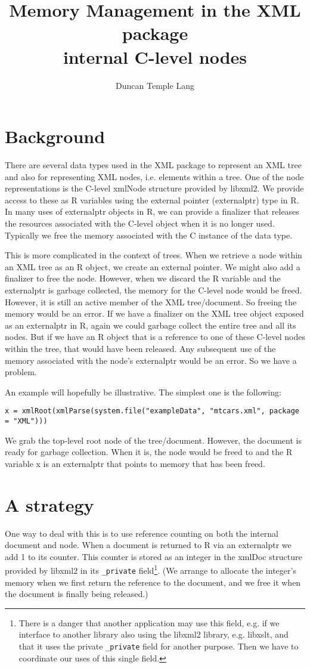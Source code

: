 \documentclass{article}
\author{Duncan Temple Lang}
\title{Memory Management in the XML package\\
internal C-level nodes}
\begin{document}
\maketitle

\section{Background}
There are several data types used in the XML package to represent an
XML tree and also for representing XML nodes, i.e. elements within a
tree.  One of the node representations is the C-level xmlNode
structure provided by libxml2. We provide access to these as R
variables using the external pointer (externalptr) type in R.
In many uses of externalptr objects in R, we can provide
a finalizer that releases the resources associated with the C-level
object when it is no longer used. Typically we free the memory 
associated with the C instance of the data type.

This is more complicated in the context of trees.  When we retrieve a
node within an XML tree as an R object, we create an external pointer.
We might also add a finalizer to free the node.  However, when we
discard the R variable and the externalptr is garbage collected, the
memory for the C-level node would be freed.  However, it is still an
active member of the XML tree/document. So freeing the memory would be
an error.  If we have a finalizer on the XML tree object exposed as an
externalptr in R, again we could garbage collect the entire tree and
all its nodes.  But if we have an R object that is a reference to one
of these C-level nodes within the tree, that would have been released.
Any subsequent use of the memory associated with the node's
externalptr would be an error.  So we have a problem.

An example will hopefully be illustrative.
The simplest one is the following:
\begin{verbatim}
x = xmlRoot(xmlParse(system.file("exampleData", "mtcars.xml", package = "XML")))
\end{verbatim}
We grab the top-level root node of the tree/document. However, the
document is ready for garbage collection. When it is, the node would
be freed to and the R variable x is an externalptr that points to
memory that has been freed.

\section{A strategy}
One way to deal with this is to use reference counting on both the
internal document and node.  When a document is returned to R via an
externalptr we add 1 to its counter.  This counter is stored as an
integer in the xmlDoc structure provided by libxml2 in its 
\verb+_private+ field\footnote{There is a danger that
another application may use this field, e.g. if we interface to
another library also using the libxml2 library, e.g. libxslt,
and that it uses the private \texttt{\_private} field for another purpose. Then
we have to coordinate our uses of this single field.}.
(We arrange to allocate the integer's memory when we first return the
reference to the document, and we free it  when the document is
finally being released.)
\end{document}
